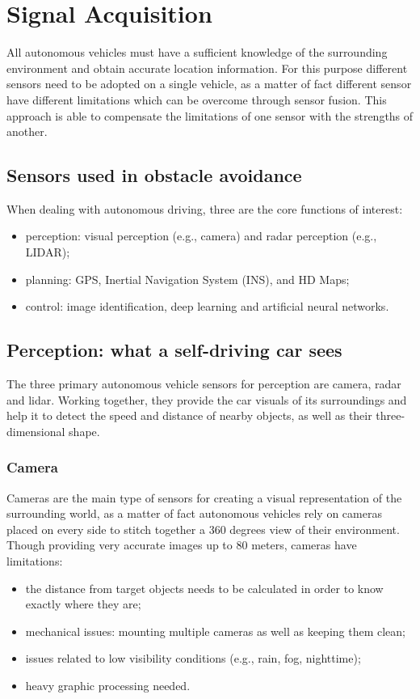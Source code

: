 \section{Signal Acquisition} 
\label{chap:SignalAcquisition}
All autonomous vehicles must have a sufficient knowledge of the surrounding environment and obtain accurate location information. For this purpose different sensors need to be adopted on a single vehicle, as a matter of fact different sensor have different limitations which can be overcome through sensor fusion. This approach is able to compensate the limitations of one sensor with the strengths of another.
\subsection{Sensors used in obstacle avoidance}
When dealing with autonomous driving, three are the core functions of interest: 
\begin{itemize}
    \item perception: visual perception (e.g., camera) and radar perception (e.g., LIDAR);
    \item planning: GPS, Inertial Navigation System (INS), and HD Maps;
    \item control: image identification, deep learning and artificial neural networks.
\end{itemize}

\subsection{Perception: what a self-driving car sees}
The three primary autonomous vehicle sensors for perception are camera, radar and lidar. Working together, they provide the car visuals of its surroundings and help it to detect the speed and distance of nearby objects, as well as their three-dimensional shape. \cite{NVIDIA}

\subsubsection{Camera} 
Cameras are the main type of sensors for creating a visual representation of the surrounding world, as a matter of fact autonomous vehicles rely on cameras placed on every side to stitch together a 360 degrees view of their environment.
Though providing very accurate images up to 80 meters, cameras have limitations:
\begin{itemize}
    \item the distance from target objects needs to be calculated in order to know exactly where they are;
    \item mechanical issues: mounting multiple cameras as well as keeping them clean;
    \item issues related to low visibility conditions (e.g., rain, fog, nighttime);
    \item heavy graphic processing needed.
\end{itemize}

